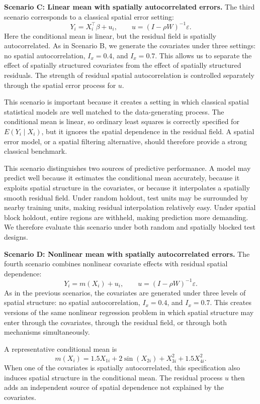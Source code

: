 \documentclass[ASNA, twocolumn]{USG} %
\begin{document}
\noindent \textbf{Scenario C: Linear mean with spatially autocorrelated errors.}
The third scenario corresponds to a classical spatial error setting:
\[
Y_i = X_i^\top\beta + u_i,
\qquad
u = (I-\rho W)^{-1}\varepsilon.
\]
Here the conditional mean is linear, but the residual field is spatially autocorrelated. As in Scenario B, we generate the covariates under three settings: no spatial autocorrelation, \(I_x=0.4\), and \(I_x=0.7\). This allows us to separate the effect of spatially structured covariates from the effect of spatially structured residuals. The strength of residual spatial autocorrelation is controlled separately through the spatial error process for \(u\).

This scenario is important because it creates a setting in which classical spatial statistical models are well matched to the data-generating process. The conditional mean is linear, so ordinary least squares is correctly specified for \(E(Y_i\mid X_i)\), but it ignores the spatial dependence in the residual field. A spatial error model, or a spatial filtering alternative, should therefore provide a strong classical benchmark.

This scenario distinguishes two sources of predictive performance. A model may predict well because it estimates the conditional mean accurately, because it exploits spatial structure in the covariates, or because it interpolates a spatially smooth residual field. Under random holdout, test units may be surrounded by nearby training units, making residual interpolation relatively easy. Under spatial block holdout, entire regions are withheld, making prediction more demanding. We therefore evaluate this scenario under both random and spatially blocked test designs.

\noindent \textbf{Scenario D: Nonlinear mean with spatially autocorrelated errors.}
The fourth scenario combines nonlinear covariate effects with residual spatial dependence:
\[
Y_i = m(X_i) + u_i,
\qquad
u = (I-\rho W)^{-1}\varepsilon.
\]
As in the previous scenarios, the covariates are generated under three levels of spatial structure: no spatial autocorrelation, \(I_x=0.4\), and \(I_x=0.7\). This creates versions of the same nonlinear regression problem in which spatial structure may enter through the covariates, through the residual field, or through both mechanisms simultaneously.

A representative conditional mean is
\[ m(X_i) =  1.5X_{1i} + 2\sin(X_{2i}) + X_{3i}^2 + 1.5X_{4i}^2.
\]
When one of the covariates is spatially autocorrelated, this specification also induces spatial structure in the conditional mean. The residual process \(u\) then adds an independent source of spatial dependence not explained by the covariates.
\end{document}
